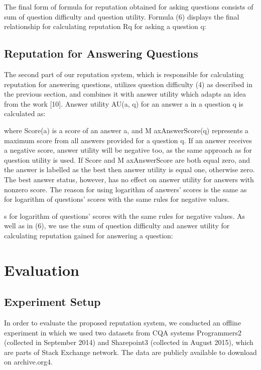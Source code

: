 \documentclass{llncs}
\begin{document}
			The final form of formula for reputation obtained for asking questions consists
			of sum of question difficulty and question utility. Formula (6) displays the final
			relationship for calculating reputation Rq for asking a question q:





			
		\subsection{Reputation for Answering Questions}
		
			The second part of our reputation system, which is responsible for calculating
			reputation for answering questions, utilizes question difficulty (4) as described in
			the previous section, and combines it with answer utility which adapts an idea
			from the work [10]. Answer utility AU(a, q) for an answer a in a question q is
			calculated as:





			where Score(a) is a score of an answer a, and M axAnswerScore(q) represents a
			maximum score from all answers provided for a question q. If an answer receives
			a negative score, answer utility will be negative too, as the same approach as
			for question utility is used. If Score and M axAnswerScore are both equal zero,
			and the answer is labelled as the best then answer utility is equal one, otherwise
			zero. The best answer status, however, has no effect on answer utility for answers
			with nonzero score. The reason for using logarithm of answers’ scores is the same
			as for logarithm of questions’ scores with the same rules for negative values.
			
			s for logarithm of questions’ scores with the same rules for negative values.
			As well as in (6), we use the sum of question difficulty and answer utility for
			calculating reputation gained for answering a question:






		
	\section{Evaluation}
		\subsection{Experiment Setup}
			In order to evaluate the proposed reputation system, we conducted an offline
			experiment in which we used two datasets from CQA systems Programmers2
			(collected in September 2014) and Sharepoint3
			(collected in August 2015), which
			are parts of Stack Exchange network. The data are publicly available to download
			on archive.org4.
			
\end{document}
